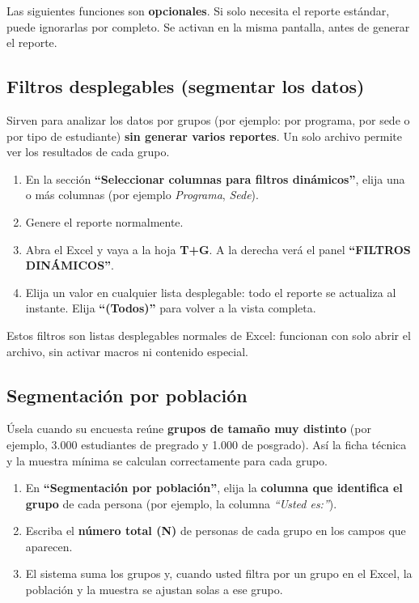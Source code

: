 \documentclass[12pt, letterpaper]{article}
\begin{document}
Las siguientes funciones son \textbf{opcionales}. Si solo necesita el reporte estándar, puede ignorarlas por completo. Se activan en la misma pantalla, antes de generar el reporte.

\subsection{Filtros desplegables (segmentar los datos)}

Sirven para analizar los datos por grupos (por ejemplo: por programa, por sede o por tipo de estudiante) \textbf{sin generar varios reportes}. Un solo archivo permite ver los resultados de cada grupo.

\begin{enumerate}[leftmargin=1cm, label=\textcolor{verdepaso}{\arabic*.}]
  \item En la sección \textbf{``Seleccionar columnas para filtros dinámicos''}, elija una o más columnas (por ejemplo \textit{Programa}, \textit{Sede}).
  \item Genere el reporte normalmente.
  \item Abra el Excel y vaya a la hoja \textbf{T+G}. A la derecha verá el panel \textbf{``FILTROS DINÁMICOS''}.
  \item Elija un valor en cualquier lista desplegable: todo el reporte se actualiza al instante. Elija \textbf{``(Todos)''} para volver a la vista completa.
\end{enumerate}

\begin{info}
  Estos filtros son listas desplegables normales de Excel: funcionan con solo abrir el archivo, sin activar macros ni contenido especial.
\end{info}

\subsection{Segmentación por población}

Úsela cuando su encuesta reúne \textbf{grupos de tamaño muy distinto} (por ejemplo, 3.000 estudiantes de pregrado y 1.000 de posgrado). Así la ficha técnica y la muestra mínima se calculan correctamente para cada grupo.

\begin{enumerate}[leftmargin=1cm, label=\textcolor{verdepaso}{\arabic*.}]
  \item En \textbf{``Segmentación por población''}, elija la \textbf{columna que identifica el grupo} de cada persona (por ejemplo, la columna \textit{``Usted es:''}).
  \item Escriba el \textbf{número total (N)} de personas de cada grupo en los campos que aparecen.
  \item El sistema suma los grupos y, cuando usted filtra por un grupo en el Excel, la población y la muestra se ajustan solas a ese grupo.
\end{enumerate}
\end{document}
